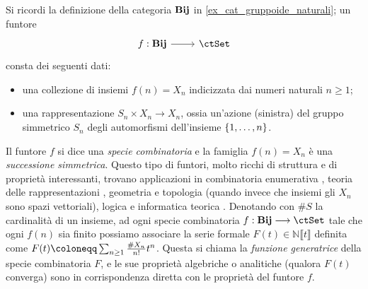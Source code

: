 \begin{example}
	Si ricordi la definizione della categoria \(\mathbf{Bij}\) in \ref{ex_cat_gruppoide_naturali}; un funtore
	\[\dmFun{f}{\cate{Bij}}{\ctSet}\]
	consta dei seguenti dati:
	\begin{itemize}
		\item una collezione di insiemi \(f(n)=X_n\) indicizzata dai numeri naturali \(n\ge 1\);
		\item una rappresentazione \(S_n \times X_n\to X_n\), ossia un'azione (sinistra) del gruppo simmetrico \(S_n\) degli automorfismi dell'insieme \(\{\iter n\}\).
	\end{itemize}
	Il funtore \(f\) si dice una \emph{specie combinatoria} e la famiglia \(f(n)=X_n\) è una \emph{successione simmetrica}. Questo tipo di funtori, molto ricchi di struttura e di proprietà interessanti, trovano applicazioni in combinatoria enumerativa \cite{bergeron1998combinatorial}, teoria delle rappresentazioni \cite{aguiar2010monoidal}, geometria e topologia \cite{fresse-operads} (quando invece che insiemi gli \(X_n\) sono spazi vettoriali), logica e informatica teorica \cite{Gambino2017,Hasegawa2002}. Denotando con \(\# S\) la cardinalità di un insieme, ad ogni specie combinatoria \(f : \cate{Bij} \fun\ctSet\) tale che ogni \(f(n)\) sia finito possiamo associare la serie formale \(F(t)\in\mathbb{N}\llbracket t\rrbracket\) definita come \(F(t) \defeq \sum_{n\ge 1} \frac{\# X_n}{n!}t^n\). Questa si chiama la \emph{funzione generatrice} della specie combinatoria \(F\), e le sue proprietà algebriche o analitiche (qualora \(F(t)\) converga) sono in corrispondenza diretta con le proprietà del funtore \(f\).
\end{example}
